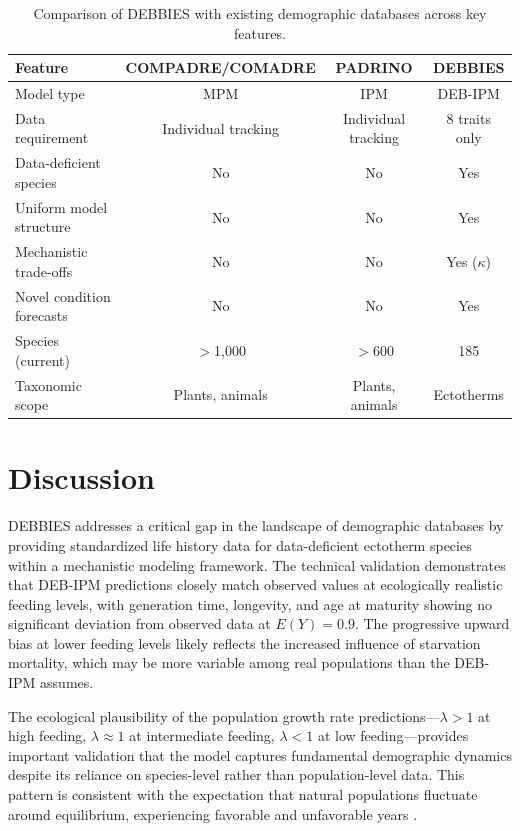 \documentclass[11pt]{article}
\begin{document}
\begin{table}[H]
\centering
\caption{Comparison of DEBBIES with existing demographic databases across key features.}
\label{tab:comparison}
\begin{tabular}{lccc}
\toprule
\textbf{Feature} & \textbf{COMPADRE/COMADRE} & \textbf{PADRINO} & \textbf{DEBBIES} \\
\midrule
Model type & MPM & IPM & DEB-IPM \\
Data requirement & Individual tracking & Individual tracking & 8 traits only \\
Data-deficient species & No & No & Yes \\
Uniform model structure & No & No & Yes \\
Mechanistic trade-offs & No & No & Yes ($\kappa$) \\
Novel condition forecasts & No & No & Yes \\
Species (current) & $>$1,000 & $>$600 & 185 \\
Taxonomic scope & Plants, animals & Plants, animals & Ectotherms \\
\bottomrule
\end{tabular}
\end{table}

\section{Discussion}

DEBBIES addresses a critical gap in the landscape of demographic databases by providing standardized life history data for data-deficient ectotherm species within a mechanistic modeling framework. The technical validation demonstrates that DEB-IPM predictions closely match observed values at ecologically realistic feeding levels, with generation time, longevity, and age at maturity showing no significant deviation from observed data at $E(Y) = 0.9$. The progressive upward bias at lower feeding levels likely reflects the increased influence of starvation mortality, which may be more variable among real populations than the DEB-IPM assumes.

The ecological plausibility of the population growth rate predictions---$\lambda > 1$ at high feeding, $\lambda \approx 1$ at intermediate feeding, $\lambda < 1$ at low feeding---provides important validation that the model captures fundamental demographic dynamics despite its reliance on species-level rather than population-level data. This pattern is consistent with the expectation that natural populations fluctuate around equilibrium, experiencing favorable and unfavorable years \citep{stearns1992evolution}.
\end{document}
